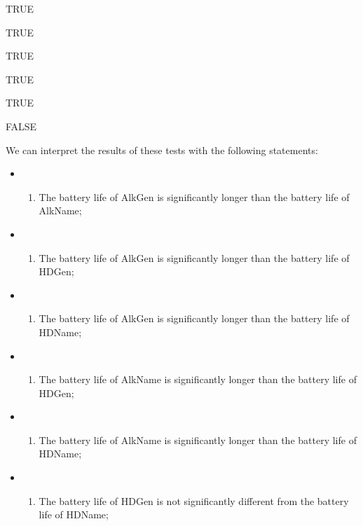 \documentclass[11pt]{article}
\providecommand{\tightlist}{%
      \setlength{\itemsep}{0pt}\setlength{\parskip}{0pt}}
\begin{document}
    TRUE

    
    TRUE

    
    TRUE

    
    TRUE

    
    TRUE

    
    FALSE

    
    We can interpret the results of these tests with the following
statements:

\begin{itemize}
\item
  \begin{enumerate}
  \def\labelenumi{\arabic{enumi}.}
  \tightlist
  \item
    The battery life of AlkGen is significantly longer than the battery
    life of AlkName;
  \end{enumerate}
\item
  \begin{enumerate}
  \def\labelenumi{\arabic{enumi}.}
  \setcounter{enumi}{1}
  \tightlist
  \item
    The battery life of AlkGen is significantly longer than the battery
    life of HDGen;
  \end{enumerate}
\item
  \begin{enumerate}
  \def\labelenumi{\arabic{enumi}.}
  \setcounter{enumi}{2}
  \tightlist
  \item
    The battery life of AlkGen is significantly longer than the battery
    life of HDName;
  \end{enumerate}
\item
  \begin{enumerate}
  \def\labelenumi{\arabic{enumi}.}
  \setcounter{enumi}{3}
  \tightlist
  \item
    The battery life of AlkName is significantly longer than the battery
    life of HDGen;
  \end{enumerate}
\item
  \begin{enumerate}
  \def\labelenumi{\arabic{enumi}.}
  \setcounter{enumi}{4}
  \tightlist
  \item
    The battery life of AlkName is significantly longer than the battery
    life of HDName;
  \end{enumerate}
\item
  \begin{enumerate}
  \def\labelenumi{\arabic{enumi}.}
  \setcounter{enumi}{2}
  \tightlist
  \item
    The battery life of HDGen is not significantly different from the
    battery life of HDName;
  \end{enumerate}
\end{itemize}
\end{document}
